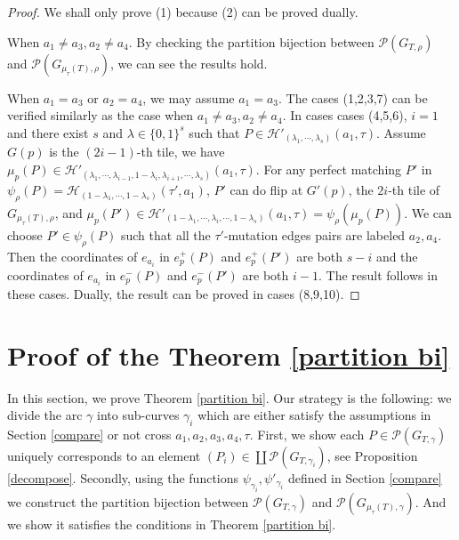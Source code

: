 \documentclass[10pt]{amsart}
\theoremstyle{theorems}
\begin{document}
\begin{proof}

We shall only prove (1) because (2) can be proved dually.

When $a_1\neq a_3, a_2\neq a_4$. By checking the partition bijection between $\mathcal P(G_{T,\rho})$ and $\mathcal P(G_{\mu_{\tau}(T),\rho})$, we can see the results hold.

When $a_1= a_3$ or $a_2= a_4$, we may assume $a_1=a_3$. The cases (1,2,3,7) can be verified similarly as the case when $a_1\neq a_3,a_2\neq a_4$. In cases cases (4,5,6), $i=1$ and there exist $s$ and $\lambda\in \{0,1\}^s$ such that $P\in \mathcal H'_{(\lambda_1,\cdots,\lambda_s)}(a_1,\tau)$. Assume $G(p)$ is the $(2i-1)$-th tile, we have $\mu_{p}(P)\in \mathcal H'_{(\lambda_1,\cdots,\lambda_{i-1},1-\lambda_i,\lambda_{i+1},\cdots,\lambda_s)}(a_1,\tau)$. For any perfect matching $P'$ in $\psi_{\rho}(P)=\mathcal H_{(1-\lambda_1,\cdots,1-\lambda_s)}(\tau',a_1)$, $P'$ can do flip at $G'(p)$, the $2i$-th tile of $G_{\mu_{\tau}(T),\rho}$, and $\mu_p(P')\in \mathcal H'_{(1-\lambda_1,\cdots,\lambda_i,\cdots,1-\lambda_s)}(a_1,\tau)=\psi_{\rho}(\mu_p(P))$. We can choose $P'\in \psi_{\rho}(P)$ such that all the $\tau'$-mutation edges pairs are labeled $a_2,a_4$. Then the coordinates of $e_{a_i}$ in  $e_p^{+}(P)$ and $e_p^{+}(P')$ are both $s-i$ and the coordinates of $e_{a_i}$ in  $e_p^{-}(P)$ and $e_p^{-}(P')$ are both $i-1$. The result follows in these cases. Dually, the result can be proved in cases (8,9,10).
\end{proof}

\medskip

\section{Proof of the Theorem \ref{partition bi}}\label{main1}

In this section, we prove Theorem \ref{partition bi}. Our strategy is the following: we divide the arc $\gamma$ into sub-curves $\gamma_i$ which are either satisfy the assumptions in Section \ref{compare} or not cross $a_1,a_2,a_3,a_4,\tau$. First, we show each $P\in \mathcal P(G_{T,\gamma})$ uniquely corresponds to an element $(P_i)\in \coprod \mathcal P(G_{T,\gamma_i})$, see Proposition \ref{decompose}. Secondly, using the functions $\psi_{\gamma_i}, \psi'_{\gamma_i}$ defined in Section \ref{compare} we construct the partition bijection between $\mathcal P(G_{T,\gamma})$ and $\mathcal P(G_{\mu_{\tau}(T),\gamma})$. And we show it satisfies the conditions in Theorem \ref{partition bi}.
\end{document}
